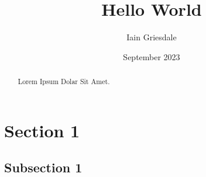 \documentclass{article}
\title{Hello World}
\author{Iain Griesdale}
\date{September 2023}
\begin{document}
\maketitle

\begin{abstract}
    Lorem Ipsum Dolar Sit Amet.
\end{abstract}

\section{Section 1}

\subsection{Subsection 1}
\end{document}
